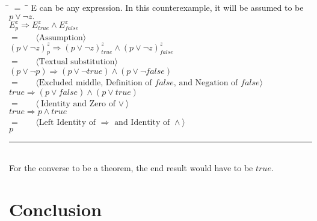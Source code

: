 \documentclass[12pt, fleqn, leqno]{article}
\newcommand{\lgap}{2pt}                             %
\newcommand{\mymathindent}{24pt}                    %
\newcommand{\impl}{\ensuremath{\Rightarrow}}        %
\newcommand{\myqed}{\rule[-.23ex]{1.2ex}{2.0ex}}
\newcommand{\myqedtab}{\hspace{384pt}}              %
\newcommand{\Gll} {\langle}                         %
\newcommand{\Ggg} {\rangle}                         %
\newcommand{\Hint}[1]     {\ \ \ $\Gll              \mbox{#1} \Ggg$ }   %
\begin{document}
\begin{tabbing}
\hspace{\mymathindent} \= $= \;$ \= \myqedtab \= \kill
E can be any expression. In this counterexample, it will be assumed to be $p \lor\lnot z.$\\
	\> \>  $E^{z}_{p} \impl E^{z}_{true}\land E^{z}_{false}$\\
	\> $=$  \>  \Hint{Assumption}\\[\lgap]
	\> \>  $(p \lor\lnot z)^{z}_{p} \impl (p \lor\lnot z)^{z}_{true}\land (p \lor\lnot z)^{z}_{false}$\\
	\> $=$  \>  \Hint{Textual substitution}\\[\lgap]
	\> \>  $(p \lor\lnot p) \impl (p \lor\lnot true)\land (p \lor\lnot false)$\\
	\> $=$  \>  \Hint{Excluded middle, Definition of $false$, and Negation of $false$}\\[\lgap]
	\> \>  $true \impl (p \lor false)\land (p \lor true)$\\
	\> $=$  \>  \Hint{Identity and Zero of $\lor$}\\[\lgap]
	\> \>  $true \impl p\land true$\\
	\> $=$  \>  \Hint{Left Identity of $\impl$ and Identity of $\land$}\\[\lgap]
	\> \>  $p$ \quad \myqed\\ For the converse to be a theorem, the end result would have to be $true$.

\end{tabbing}

\section{Conclusion}



\end{document}
